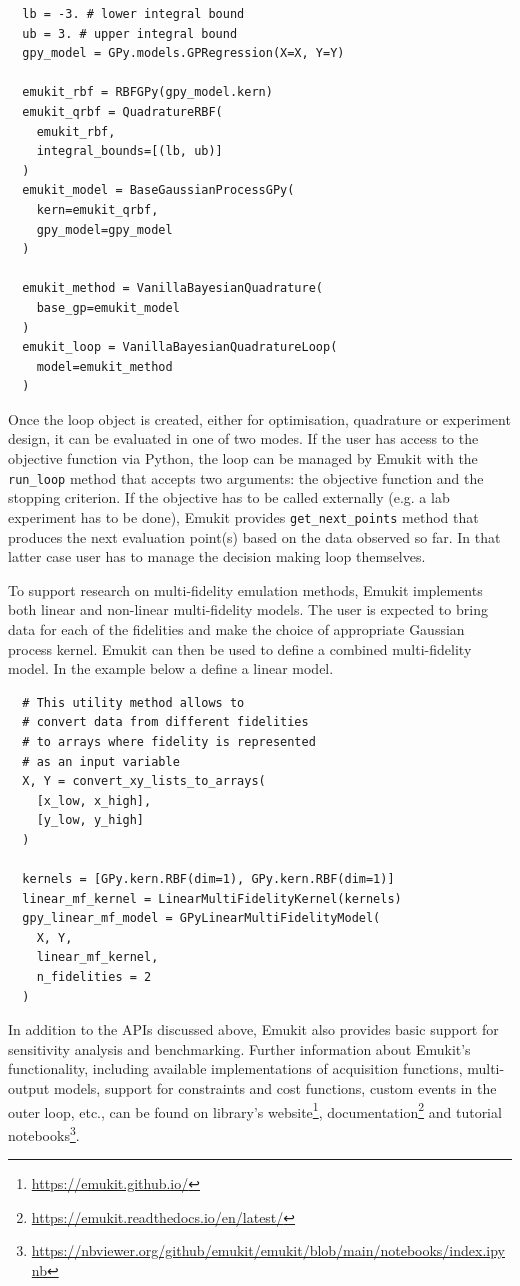 \begin{verbatim}
  lb = -3. # lower integral bound
  ub = 3. # upper integral bound
  gpy_model = GPy.models.GPRegression(X=X, Y=Y)

  emukit_rbf = RBFGPy(gpy_model.kern)
  emukit_qrbf = QuadratureRBF(
    emukit_rbf,
    integral_bounds=[(lb, ub)]
  )
  emukit_model = BaseGaussianProcessGPy(
    kern=emukit_qrbf,
    gpy_model=gpy_model
  )

  emukit_method = VanillaBayesianQuadrature(
    base_gp=emukit_model
  )
  emukit_loop = VanillaBayesianQuadratureLoop(
    model=emukit_method
  )
\end{verbatim}

Once the loop object is created, either for optimisation, quadrature or experiment design, it can be evaluated in one of two modes. If the user has access to the objective function via Python, the loop can be managed by Emukit with the \texttt{run_loop} method that accepts two arguments: the objective function and the stopping criterion. If the objective has to be called externally (e.g. a lab experiment has to be done), Emukit provides \texttt{get_next_points} method that produces the next evaluation point(s) based on the data observed so far. In that latter case user has to manage the decision making loop themselves.

To support research on multi-fidelity emulation methods, Emukit implements both linear and non-linear multi-fidelity models. The user is expected to bring data for each of the fidelities and make the choice of appropriate Gaussian process kernel. Emukit can then be used to define a combined multi-fidelity model. In the example below a define a linear model.

\begin{verbatim}
  # This utility method allows to
  # convert data from different fidelities
  # to arrays where fidelity is represented
  # as an input variable
  X, Y = convert_xy_lists_to_arrays(
    [x_low, x_high],
    [y_low, y_high]
  )

  kernels = [GPy.kern.RBF(dim=1), GPy.kern.RBF(dim=1)]
  linear_mf_kernel = LinearMultiFidelityKernel(kernels)
  gpy_linear_mf_model = GPyLinearMultiFidelityModel(
    X, Y,
    linear_mf_kernel,
    n_fidelities = 2
  )
\end{verbatim}

In addition to the APIs discussed above, Emukit also provides basic support for sensitivity analysis and benchmarking. Further information about Emukit's functionality, including available implementations of acquisition functions, multi-output models, support for constraints and cost functions, custom events in the outer loop, etc., can be found on library's website\footnote{\url{https://emukit.github.io/}}, documentation\footnote{\url{https://emukit.readthedocs.io/en/latest/}} and tutorial notebooks\footnote{\url{https://nbviewer.org/github/emukit/emukit/blob/main/notebooks/index.ipynb}}. 

